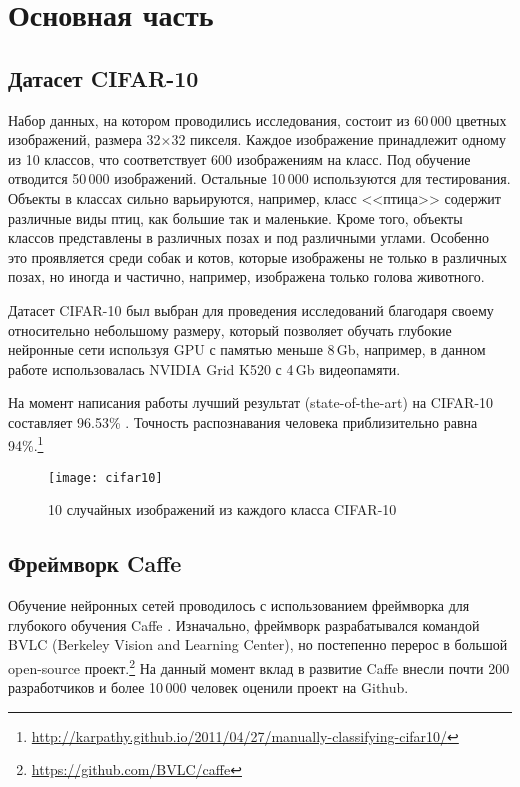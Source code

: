 \section{Основная часть}
\subsection{Датасет CIFAR-10}
Набор данных, на котором проводились исследования, состоит из 60\,000 цветных изображений, размера 
32$\times$32 пикселя. Каждое изображение принадлежит одному из 10 классов, что соответствует 600 изображениям на класс. Под 
обучение отводится 50\,000 изображений. Остальные 10\,000 используются для тестирования. Объекты в классах сильно варьируются, 
например, класс <<птица>> содержит различные виды птиц, как большие так и маленькие. Кроме того, объекты классов представлены в 
различных позах и под различными углами. Особенно это проявляется среди собак и котов, которые изображены не только в различных 
позах, но иногда и частично, например, изображена только голова животного.

Датасет CIFAR-10 \cite{learningmultiple} был выбран для проведения исследований благодаря своему относительно небольшому размеру, 
который позволяет обучать глубокие нейронные сети используя GPU с памятью меньше 8\,Gb, например, в данном работе использовалась 
NVIDIA Grid K520 с 4\,Gb видеопамяти.

На момент написания работы лучший результат (state-of-the-art) на CIFAR-10 составляет 96.53\% \cite{2014arXiv1412}. Точность  
распознавания человека приблизительно равна 
94\%.\footnote{\url{http://karpathy.github.io/2011/04/27/manually-classifying-cifar10/}}

\begin{figure}[h]
\centering
\texttt{[image: cifar10]}
\caption{10 случайных изображений из каждого класса CIFAR-10}
\end{figure}

\subsection{Фреймворк Caffe}
Обучение нейронных сетей проводилось с использованием фреймворка для глубокого обучения Caffe \cite{jia2014caffe}.
Изначально, фреймворк разрабатывался командой BVLC (Berkeley Vision and Learning Center), но постепенно перерос в большой 
open-source проект.\footnote{\url{https://github.com/BVLC/caffe}} На данный момент вклад в развитие Caffe внесли почти 200 
разработчиков и более 10\,000 человек оценили проект на Github.

